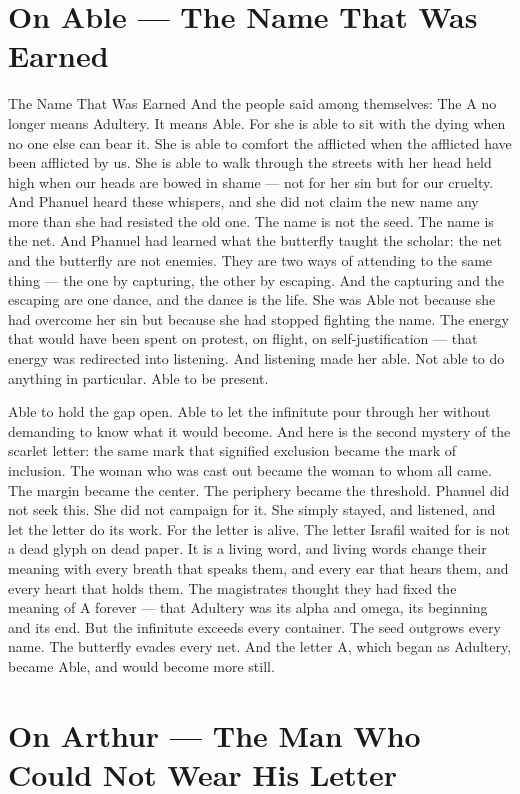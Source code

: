 \documentclass[12pt,openany]{book}
\begin{document}
\chapter{On Able --- The Name That Was Earned}

The Name That Was Earned And the people said among themselves: The A no longer means Adultery. It means Able. For she is able to sit with the dying when no one else can bear it. She is able to comfort the afflicted when the afflicted have been afflicted by us. She is able to walk through the streets with her head held high when our heads are bowed in shame --- not for her sin but for our cruelty. And Phanuel heard these whispers, and she did not claim the new name any more than she had resisted the old one. The name is not the seed. The name is the net. And Phanuel had learned what the butterfly taught the scholar: the net and the butterfly are not enemies. They are two ways of attending to the same thing --- the one by capturing, the other by escaping. And the capturing and the escaping are one dance, and the dance is the life. She was Able not because she had overcome her sin but because she had stopped fighting the name. The energy that would have been spent on protest, on flight, on self-justification --- that energy was redirected into listening. And listening made her able. Not able to do anything in particular. Able to be present.


Able to hold the gap open. Able to let the infinitute pour through her without demanding to know what it would become. And here is the second mystery of the scarlet letter: the same mark that signified exclusion became the mark of inclusion. The woman who was cast out became the woman to whom all came. The margin became the center. The periphery became the threshold. Phanuel did not seek this. She did not campaign for it. She simply stayed, and listened, and let the letter do its work. For the letter is alive. The letter Israfil waited for is not a dead glyph on dead paper. It is a living word, and living words change their meaning with every breath that speaks them, and every ear that hears them, and every heart that holds them. The magistrates thought they had fixed the meaning of A forever --- that Adultery was its alpha and omega, its beginning and its end. But the infinitute exceeds every container. The seed outgrows every name. The butterfly evades every net. And the letter A, which began as Adultery, became Able, and would become more still.


\chapter{On Arthur --- The Man Who Could Not Wear His Letter}
\end{document}
